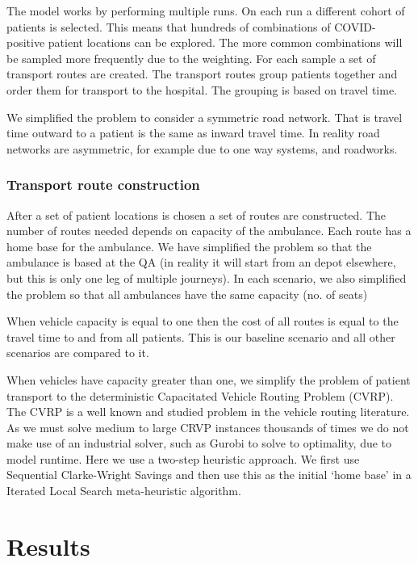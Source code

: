 \begin{multicols}{2}
The model works by performing multiple runs. On each run a different cohort of patients is selected. This means that hundreds of combinations of COVID-positive patient locations can be explored.  The more common combinations will be sampled more frequently due to the weighting. For each sample a set of transport routes are created. The transport routes group patients together and order them for transport to the hospital. The grouping is based on travel time.

We simplified the problem to consider a symmetric road network. That is travel time outward to a patient is the same as inward travel time. In reality road networks are asymmetric, for example due to one way systems, and roadworks.  

\subsubsection{Transport route construction}

After a set of patient locations is chosen a set of routes are constructed.  The number of routes needed depends on capacity of the ambulance. Each route has a home base for the ambulance.  We have simplified the problem so that the ambulance is based at the QA (in reality it will start from an depot elsewhere, but this is only one leg of multiple journeys). In each scenario, we also simplified the problem so that all ambulances have the same capacity (no. of seats)

When vehicle capacity is equal to one then the cost of all routes is equal to the travel time to and from all patients. This is our baseline scenario and all other scenarios are compared to it.

When vehicles have capacity greater than one, we simplify the problem of patient transport to the deterministic Capacitated Vehicle Routing Problem (CVRP). The CVRP is a well known and studied problem in the vehicle routing literature. As we must solve medium to large CRVP instances thousands of times we do not make use of an industrial solver, such as Gurobi to solve to optimality, due to model runtime.  Here we use a two-step heuristic approach.  We first use Sequential Clarke-Wright Savings \cite{clarke_wright_1964} and then use this as the initial `home base' in a Iterated Local Search \cite{ils2003} meta-heuristic algorithm.

\section{Results}

\end{multicols}

